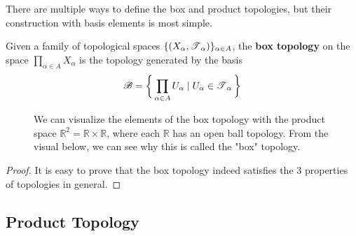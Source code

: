   There are multiple ways to define the box and product topologies, but their construction with basis elements is most simple. 

  \begin{definition}
    Given a family of topological spaces $\{(X_\alpha, \T_\alpha)\}_{\alpha \in A}$, the \textbf{box topology} on the space $\prod_{\alpha \in A} X_\alpha$ is the topology generated by the basis 
    \begin{equation}
      \mathscr{B} = \bigg\{ \prod_{\alpha \in A} U_\alpha \mid U_\alpha \in \T_\alpha \bigg\}
    \end{equation}

    \begin{figure}[H]
      \centering 
      \caption{We can visualize the elements of the box topology with the product space $\mathbb{R}^2 = \mathbb{R} \times \mathbb{R}$, where each $\mathbb{R}$ has an open ball topology. From the visual below, we can see why this is called the "box" topology. }
      \label{fig:box_topology}
    \end{figure}
  \end{definition}
  \begin{proof}
    It is easy to prove that the box topology indeed satisfies the 3 properties of topologies in general. 
  \end{proof}

\subsection{Product Topology}

